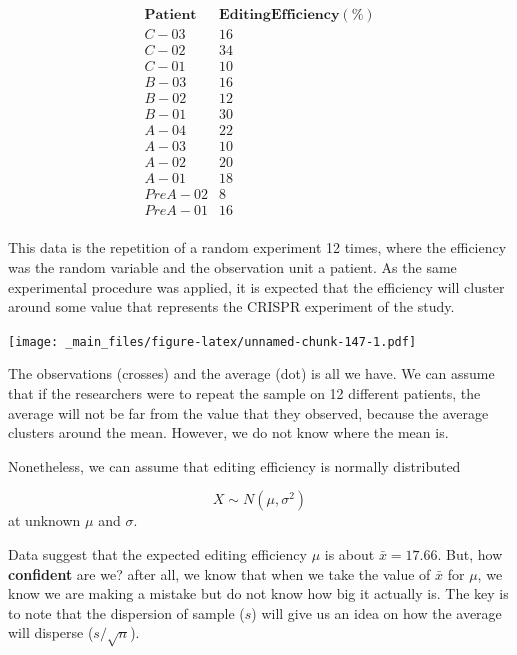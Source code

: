 \documentclass[
]{book}
\begin{document}
\[
\begin{array}{cc}
 \mathbf{Patient} & \mathbf{Editing Efficiency (\%)} \\
 C-03      & 16                     \\
 C-02      & 34                     \\
 C-01      & 10                     \\
 B-03      & 16                     \\
 B-02      & 12                     \\
 B-01      & 30                     \\
 A-04      & 22                     \\
 A-03      & 10                     \\
 A-02      & 20                     \\
 A-01      & 18                     \\
 PreA-02   & 8                      \\
 PreA-01   & 16                     \\
\end{array}
\]

This data is the repetition of a random experiment 12 times, where the efficiency was the random variable and the observation unit a patient. As the same experimental procedure was applied, it is expected that the efficiency will cluster around some value that represents the CRISPR experiment of the study.

\texttt{[image: \_main\_files/figure-latex/unnamed-chunk-147-1.pdf]}

The observations (crosses) and the average (dot) is all we have. We can assume that if the researchers were to repeat the sample on 12 different patients, the average will not be far from the value that they observed, because the average clusters around the mean. However, we do not know where the mean is.

Nonetheless, we can assume that editing efficiency is normally distributed

\[X \sim N(\mu, \sigma^2)\]
at unknown \(\mu\) and \(\sigma\).

Data suggest that the expected editing efficiency \(\mu\) is about \(\bar{x}=17.66\). But, how \textbf{confident} are we? after all, we know that when we take the value of \(\bar{x}\) for \(\mu\), we know we are making a mistake but do not know how big it actually is. The key is to note that the dispersion of sample (\(s\)) will give us an idea on how the average will disperse (\(s/\sqrt{n}\)).
\end{document}

